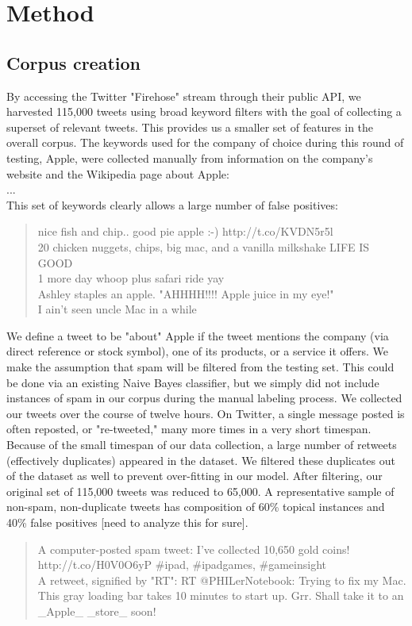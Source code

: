 \documentclass[letterpaper]{article}
\begin{document}
\section{Method}
\subsection{Corpus creation}
By accessing the Twitter "Firehose" stream through their public API, we harvested 115,000 tweets using broad keyword filters with the goal of collecting a superset of relevant tweets. This provides us a smaller set of features in the overall corpus. The keywords used for the company of choice during this round of testing, Apple, were collected manually from information on the company's website and the Wikipedia page about Apple:\\
...\\

This set of keywords clearly allows a large number of false positives:\\
\begin{quote}
nice fish and chip.. good pie apple :-) http://t.co/KVDN5r5l \\
20 chicken nuggets, chips, big mac, and a vanilla milkshake LIFE IS GOOD \\
1 more day whoop plus safari ride yay \\
Ashley staples an apple.  "AHHHH!!!!  Apple juice in my eye!" \\
I ain't seen uncle Mac in a while \\
\end{quote}

We define a tweet to be "about" Apple if the tweet mentions the company (via direct reference or stock symbol), one of its products, or a service it offers. We make the assumption that spam will be filtered from the testing set. This could be done via an existing Naive Bayes classifier, but we simply did not include instances of spam in our corpus during the manual labeling process. We collected our tweets over the course of twelve hours. On Twitter, a single message posted is often reposted, or "re-tweeted," many more times in a very short timespan. Because of the small timespan of our data collection, a large number of retweets (effectively duplicates) appeared in the dataset. We filtered these duplicates out of the dataset as well to prevent over-fitting in our model. After filtering, our original set of 115,000 tweets was reduced to 65,000. A representative sample of non-spam, non-duplicate tweets has composition of 60\% topical instances and 40\% false positives [need to analyze this for sure].
\begin{quote}
A computer-posted spam tweet: I've collected 10,650 gold coins! http://t.co/H0V0O6yP \#ipad, \#ipadgames, \#gameinsight\\
A retweet, signified by "RT": RT @PHILerNotebook: Trying to fix my Mac. This gray loading bar takes 10 minutes to start up. Grr. Shall take it to an \_Apple\_ \_store\_ soon! \\
\end{quote}
\end{document}
